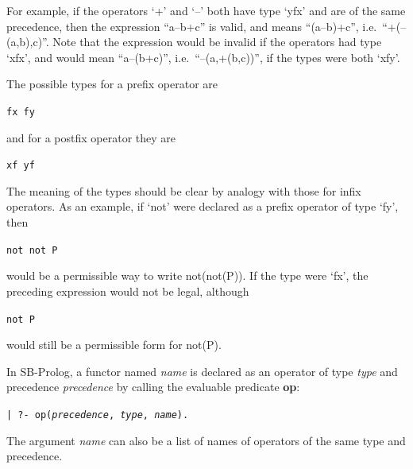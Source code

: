 For example, if the operators `+' and `--' both have type `yfx'
and are of the same precedence, then the expression
``a--b+c'' is valid, and means ``(a--b)+c'', i.e.\ ``+(--(a,b),c)''.
Note that the expression would be invalid if the operators had type
`xfx', and would mean ``a--(b+c)'', i.e.\ ``--(a,+(b,c))'',
if the types were both `xfy'.

The possible types for a prefix operator are
\begin{center}
{\tt fx        fy}
\end{center}
and for a postfix operator they are
\begin{center}
{\tt xf        yf}
\end{center}
The meaning of the types should be clear by analogy with those for
infix operators.
As an example, if `not' were declared as a prefix
operator of type `fy', then
\begin{center}
{\tt not not P}
\end{center}
would be a permissible way to write not(not(P)).
If the type were `fx', the preceding expression would not be legal, although
\begin{center}
{\tt not P}
\end{center}
would still be a permissible form for not(P).

In SB-Prolog, a functor named {\em name} is declared as an
operator of type {\em type} and precedence {\em precedence} by calling
the evaluable predicate {\bf op}:
\begin{center}
{\tt | ?- op({\em precedence}, {\em type}, {\em name}).}
\end{center}
The argument {\em name} can also be a list of names of operators of the same
type and precedence.

